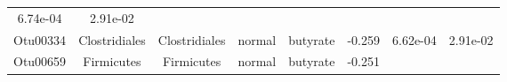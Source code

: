 \documentclass[11pt,]{article}
\begin{document}
\begin{longtable}[]{@{}cccccccc@{}}
\begin{minipage}[t]{0.08\columnwidth}
6.74e-04\strut
\end{minipage} & \begin{minipage}[t]{0.08\columnwidth}\centering\strut
2.91e-02\strut
\end{minipage}\tabularnewline
\begin{minipage}[t]{0.08\columnwidth}\centering\strut
Otu00334\strut
\end{minipage} & \begin{minipage}[t]{0.15\columnwidth}\centering\strut
Clostridiales\strut
\end{minipage} & \begin{minipage}[t]{0.15\columnwidth}\centering\strut
Clostridiales\strut
\end{minipage} & \begin{minipage}[t]{0.08\columnwidth}\centering\strut
normal\strut
\end{minipage} & \begin{minipage}[t]{0.09\columnwidth}\centering\strut
butyrate\strut
\end{minipage} & \begin{minipage}[t]{0.07\columnwidth}\centering\strut
-0.259\strut
\end{minipage} & \begin{minipage}[t]{0.08\columnwidth}\centering\strut
6.62e-04\strut
\end{minipage} & \begin{minipage}[t]{0.08\columnwidth}\centering\strut
2.91e-02\strut
\end{minipage}\tabularnewline
\begin{minipage}[t]{0.08\columnwidth}\centering\strut
Otu00659\strut
\end{minipage} & \begin{minipage}[t]{0.15\columnwidth}\centering\strut
Firmicutes\strut
\end{minipage} & \begin{minipage}[t]{0.15\columnwidth}\centering\strut
Firmicutes\strut
\end{minipage} & \begin{minipage}[t]{0.08\columnwidth}\centering\strut
normal\strut
\end{minipage} & \begin{minipage}[t]{0.09\columnwidth}\centering\strut
butyrate\strut
\end{minipage} & \begin{minipage}[t]{0.07\columnwidth}\centering\strut
-0.251\strut
\end{minipage} & \begin{minipage}[t]{0.08\columnwidth}\centering\strut

\end{minipage}
\end{longtable}
\end{document}
